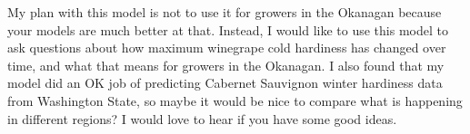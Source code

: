 \documentclass[11pt,letter]{article}
\begin{document}
My plan with this model is not to use it for growers in the Okanagan because your models are much better at that. Instead, I would like to use this model to ask questions about how maximum winegrape cold hardiness has changed over time, and what that means for growers in the Okanagan. I also found that my model did an OK job of predicting Cabernet Sauvignon winter hardiness data from Washington State, so maybe it would be nice to compare what is happening in different regions? I would love to hear if you have some good ideas. \\

\FloatBarrier


\end{document}
